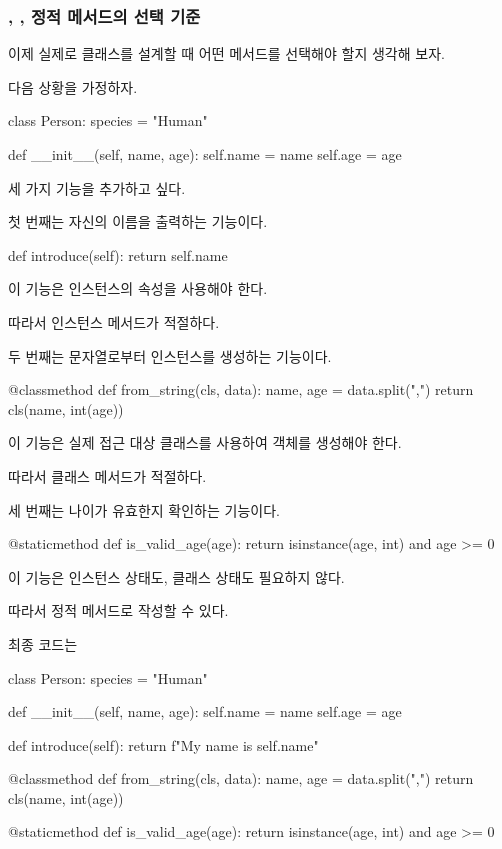 \subsubsection{, , 정적 메서드의 선택 기준}

이제 실제로 클래스를 설계할 때 어떤 메서드를 선택해야 할지 생각해 보자.

다음 상황을 가정하자.

\begin{dhkcode}
class Person:
    species = "Human"

    def __init__(self, name, age):
        self.name = name
        self.age = age
\end{dhkcode}

세 가지 기능을 추가하고 싶다.

첫 번째는 자신의 이름을 출력하는 기능이다.

\begin{dhkcode}
def introduce(self):
    return self.name
\end{dhkcode}

이 기능은 인스턴스의  속성을 사용해야 한다.

따라서 인스턴스 메서드가 적절하다.

두 번째는 문자열로부터 인스턴스를 생성하는 기능이다.

\begin{dhkcode}
@classmethod
def from_string(cls, data):
    name, age = data.split(",")
    return cls(name, int(age))
\end{dhkcode}

이 기능은 실제 접근 대상 클래스를 사용하여 객체를 생성해야 한다.

따라서 클래스 메서드가 적절하다.

세 번째는 나이가 유효한지 확인하는 기능이다.

\begin{dhkcode}
@staticmethod
def is_valid_age(age):
    return isinstance(age, int) and age >= 0
\end{dhkcode}

이 기능은 인스턴스 상태도, 클래스 상태도 필요하지 않다.

따라서 정적 메서드로 작성할 수 있다.

최종 코드는

\begin{dhkcode}
class Person:
    species = "Human"

    def __init__(self, name, age):
        self.name = name
        self.age = age

    def introduce(self):
        return f"My name is {self.name}"

    @classmethod
    def from_string(cls, data):
        name, age = data.split(",")
        return cls(name, int(age))

    @staticmethod
    def is_valid_age(age):
        return isinstance(age, int) and age >= 0
\end{dhkcode}

